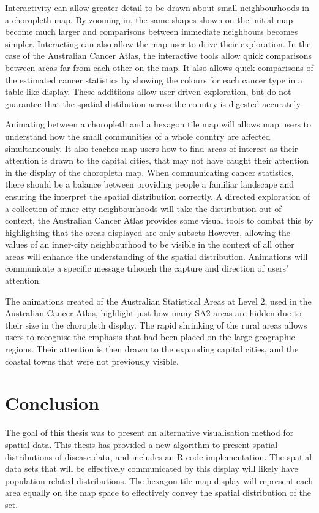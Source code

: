 \documentclass{monashthesis}
\begin{document}
Interactivity can allow greater detail to be drawn about small neighbourhoods in a choropleth map. By zooming in, the same shapes shown on the initial map become much larger and comparisons between immediate neighbours becomes simpler.
Interacting can also allow the map user to drive their exploration. In the case of the Australian Cancer Atlas, the interactive tools allow quick comparisons between areas far from each other on the map. It also allows quick comparisons of the estimated cancer statistics by showing the colours for each cancer type in a table-like display. These additiions allow user driven exploration, but do not guarantee that the spatial distibution across the country is digested accurately.

Animating between a choropleth and a hexagon tile map will allows map users to understand how the small communities of a whole country are affected simultaneously. It also teaches map users how to find areas of interest as their attention is drawn to the capital cities, that may not have caught their attention in the display of the choropleth map. When communicating cancer statistics, there should be a balance between providing people a familiar landscape and ensuring the interpret the spatial distribution correctly. A directed exploration of a collection of inner city neighbourhoods will take the distiribution out of context, the Australian Cancer Atlas provides some visual tools to combat this by highlighting that the areas displayed are only subsets However, allowing the values of an inner-city neighbourhood to be visible in the context of all other areas will enhance the understanding of the spatial distribution. Animations will communicate a specific message trhough the capture and direction of users' attention.

The animations created of the Australian Statistical Areas at Level 2, used in the Australian Cancer Atlas, highlight just how many SA2 areas are hidden due to their size in the choropleth display. The rapid shrinking of the rural areas allows users to recognise the emphasis that had been placed on the large geographic regions.
Their attention is then drawn to the expanding capital cities, and the coastal towns that were not previously visible.

\hypertarget{ch:conclusion}{%
\chapter{Conclusion}\label{ch:conclusion}}

The goal of this thesis was to present an alternative visualisation method for spatial data. This thesis has provided a new algorithm to present spatial distributions of disease data, and includes an R code \autocite{R} implementation. The spatial data sets that will be effectively communicated by this display will likely have population related distributions. The hexagon tile map display will represent each area equally on the map space to effectively convey the spatial distribution of the set.
\end{document}
